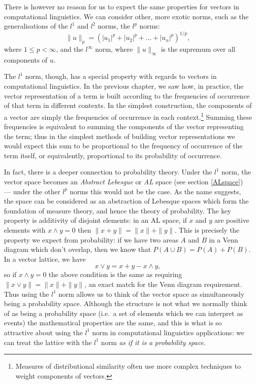 There is however no reason for us to expect the same properties for vectors in computational linguistics. We can consider other, more exotic norms, such as the generalisations of the $l^1$ and $l^2$ norms, the $l^p$ norms:
$$\|u\|_p = (|u_1|^p + |u_2|^p +\ldots + |u_n|^p)^{1/p},$$
where $1 \le p < \infty$, and the $l^\infty$ norm, where $\|u\|_\infty$ is the supremum over all components of $u$.

The $l^1$ norm, though, has a special property with regards to vectors in computational linguistics. In the previous chapter, we saw  how, in practice, the vector representation of a term is built according to the frequencies of occurrence of that term in different contexts. In the simplest construction, the components of a vector are simply the frequencies of occurrence in each context.\footnote{Measures of distributional similarity often use more complex techniques to weight components of vectors.} Summing these frequencies is equivalent to summing the components of the vector representing the term; thus in the simplest methods of building vector representations we would expect this sum to be proportional to the frequency of occurrence of the term itself, or equivalently, proportional to its probability of occurrence.

In fact, there is a deeper connection to probability theory. Under the $l^1$ norm, the vector space becomes an \emph{Abstract Lebesgue} or \emph{AL} space (see section \ref{ALspace}) --- under the other $l^p$ norms this would not be the case. As the name suggests, the space can be considered as an abstraction of Lebesque spaces which form the foundation of measure theory, and hence the theory of probability. The key property is additivity of disjoint elements: in an AL space, if $x$ and $y$ are positive elements with $x \land y = 0$ then $\|x + y\| = \|x\| + \|y\|$. This is precisely the property we expect from probability: if we have two areas $A$ and $B$ in a Venn diagram which don't overlap, then we know that $P(A\cup B) = P(A) + P(B)$. In a vector lattice, we have
$$x \lor y = x + y - x \land y,$$
so if $x\land y = 0$ the above condition is the same as requiring $\|x \lor y\| = \|x\| + \|y\|$, an exact match for the Venn diagram requirement. Thus using the $l^1$ norm allows us to think of the vector space as simultaneously being a probability space. Although the structure is not what we normally think of as being a probability space (i.e.~a set of elements which we can interpret as events) the mathematical properties are the same, and this is what is so attractive about using the $l^1$ norm in computational linguistics applications: we can treat the lattice with the $l^1$ norm \emph{as if it is a probability space}.

